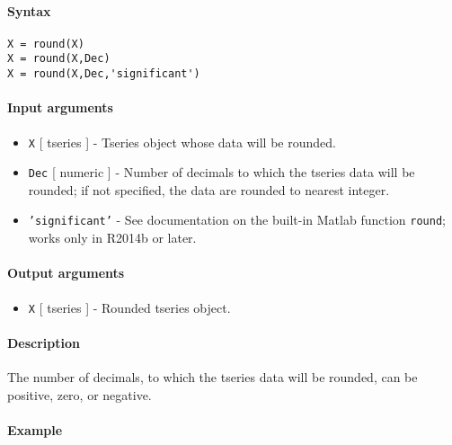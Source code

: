 


	\paragraph{Syntax}\label{syntax}

\begin{verbatim}
X = round(X)
X = round(X,Dec)
X = round(X,Dec,'significant')
\end{verbatim}

\paragraph{Input arguments}\label{input-arguments}

\begin{itemize}
\item
  \texttt{X} {[} tseries {]} - Tseries object whose data will be
  rounded.
\item
  \texttt{Dec} {[} numeric {]} - Number of decimals to which the tseries
  data will be rounded; if not specified, the data are rounded to
  nearest integer.
\item
  \texttt{'significant'} - See documentation on the built-in Matlab
  function \texttt{round}; works only in R2014b or later.
\end{itemize}

\paragraph{Output arguments}\label{output-arguments}

\begin{itemize}
\itemsep1pt\parskip0pt
\item
  \texttt{X} {[} tseries {]} - Rounded tseries object.
\end{itemize}

\paragraph{Description}\label{description}

The number of decimals, to which the tseries data will be rounded, can
be positive, zero, or negative.

\paragraph{Example}\label{example}


